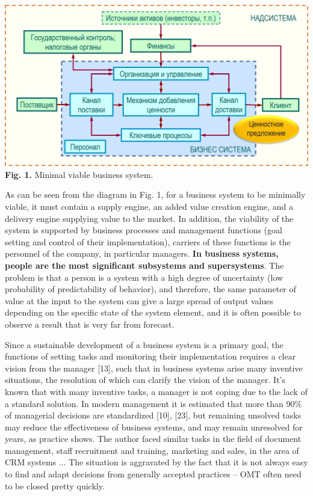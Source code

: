 \documentclass[11pt,a4paper]{book}
\begin{document}
\begin{center}
  \includegraphics[width=.8\textwidth]{figures/fig.1.jpg}\\
  \textbf{Fig. 1.} Minimal viable business system.
\end{center}

As can be seen from the diagram in Fig. 1, for a business system to be
minimally viable, it must contain a supply engine, an added value creation
engine, and a delivery engine supplying value to the market. In addition, the
viability of the system is supported by business processes and management
functions (goal setting and control of their implementation), carriers of
these functions is the personnel of the company, in particular managers.
\textbf{In business systems, people are the most significant subsystems and
  supersystems}. The problem is that a person is a system with a high degree
of uncertainty (low probability of predictability of behavior), and therefore,
the same parameter of value at the input to the system can give a large spread
of output values depending on the specific state of the system element, and it
is often possible to observe a result that is very far from forecast.

Since a sustainable development of a business system is a primary goal, the
functions of setting tasks and monitoring their implementation requires a
clear vision from the manager [13], such that in business systems arise many
inventive situations, the resolution of which can clarify the vision of the
manager. It’s known that with many inventive tasks, a manager is not coping
due to the lack of a standard solution. In modern management it is estimated
that more than 90\% of managerial decisions are standardized [10], [23], but
remaining unsolved tasks may reduce the effectiveness of business systems, and
may remain unresolved for years, as practice shows. The author faced similar
tasks in the field of document management, staff recruitment and training,
marketing and sales, in the area of CRM systems ... The situation is
aggravated by the fact that it is not always easy to find and adapt decisions
from generally accepted practices -- OMT often need to be closed pretty
quickly.
\end{document}
